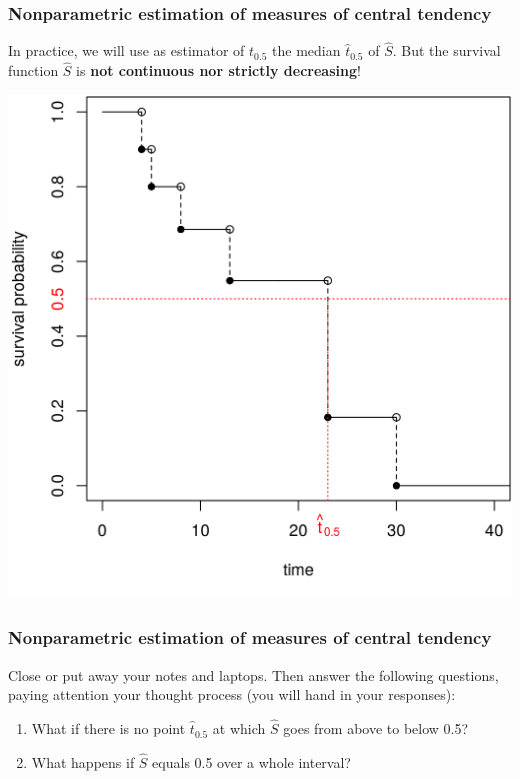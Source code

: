 \documentclass[12pt, 
hyperref={colorlinks=true, linkcolor=blue, urlcolor=cyan},dvipsnames]{beamer}
\begin{document}
\begin{frame}
\frametitle{Nonparametric estimation of measures of central tendency}
In practice, we will use as estimator of $t_{0.5}$ the median $\hat{t}_{0.5}$ of $\widehat{S}$. But the survival function $\widehat{S}$ is \textbf{not continuous nor strictly decreasing}!

\begin{center}
\includegraphics[width=0.6\textheight]{figs/km_small_example_median.png}
\end{center}
\end{frame}


\begin{frame}
\frametitle{Nonparametric estimation of measures of central tendency}
Close or put away your notes and laptops. Then answer the following questions, paying attention your thought process (you will hand in your responses):
\begin{enumerate}
\item What if there is no point $\hat{t}_{0.5}$ at which $\widehat{S}$ goes from above to below 0.5?
\item What happens if $\widehat{S}$ equals 0.5 over a whole interval?
\end{enumerate}

\end{frame}
\end{document}
